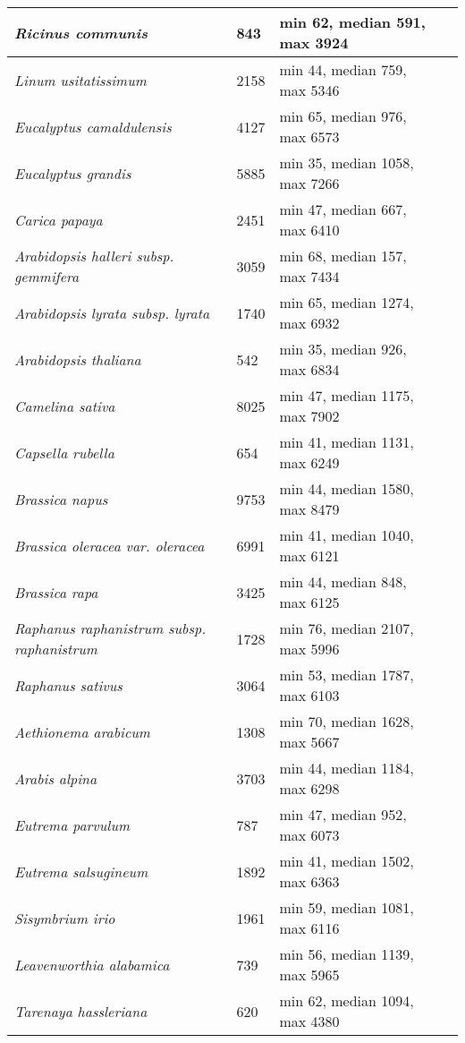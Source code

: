 {\begin{longtable}{| L{4cm} | L{2cm}  | L{5cm} | L{4cm} |}
\textit{Ricinus communis} & 843 & min 62, median 591, max 3924 & \\ \hline
\textit{Linum usitatissimum} & 2158 & min 44, median 759, max 5346 & \\ \hline
\textit{Eucalyptus camaldulensis} & 4127 & min 65, median 976, max 6573 & \\ \hline
\textit{Eucalyptus grandis} & 5885 & min 35, median 1058, max 7266 & \\ \hline
\textit{Carica papaya} & 2451 & min 47, median 667, max 6410 & \\ \hline
\textit{Arabidopsis halleri subsp. gemmifera} & 3059 & min 68, median 157, max 7434 & \\ \hline
\textit{Arabidopsis lyrata subsp. lyrata} & 1740 & min 65, median 1274, max 6932 & \\ \hline
\textit{Arabidopsis thaliana} & 542 & min 35, median 926, max 6834 & \\ \hline
\textit{Camelina sativa} & 8025 & min 47, median 1175, max 7902 & \\ \hline
\textit{Capsella rubella} & 654 & min 41, median 1131, max 6249 & \\ \hline
\textit{Brassica napus} & 9753 & min 44, median 1580, max 8479 & \\ \hline
\textit{Brassica oleracea var. oleracea} & 6991 & min 41, median 1040, max 6121 & \\ \hline
\textit{Brassica rapa} & 3425 & min 44, median 848, max 6125 & \\ \hline
\textit{Raphanus raphanistrum subsp. raphanistrum} & 1728 & min 76, median 2107, max 5996 & \\ \hline
\textit{Raphanus sativus} & 3064 & min 53, median 1787, max 6103 & \\ \hline
\textit{Aethionema arabicum} & 1308 & min 70, median 1628, max 5667 & \\ \hline
\textit{Arabis alpina} & 3703 & min 44, median 1184, max 6298 & \\ \hline
\textit{Eutrema parvulum} & 787 & min 47, median 952, max 6073 & \\ \hline
\textit{Eutrema salsugineum} & 1892 & min 41, median 1502, max 6363 & \\ \hline
\textit{Sisymbrium irio} & 1961 & min 59, median 1081, max 6116 & \\ \hline
\textit{Leavenworthia alabamica} & 739 & min 56, median 1139, max 5965 & \\ \hline
\textit{Tarenaya hassleriana} & 620 & min 62, median 1094, max 4380 & \\ \hline

\end{longtable}}

